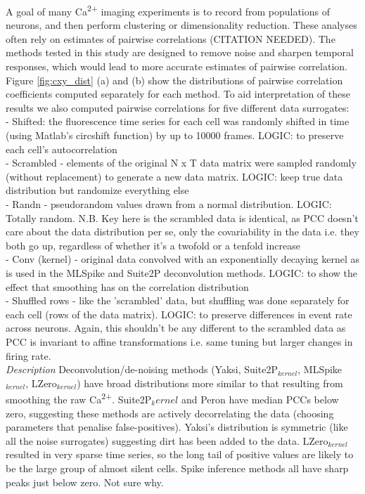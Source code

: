 \documentclass[a4paper,10pt,twocolumn]{article}
\begin{document}
A goal of many Ca\textsuperscript{2+} imaging experiments is to record from populations of neurons, and then perform clustering or dimensionality reduction. These analyses often rely on estimates of pairwise correlations (CITATION NEEDED). The methods tested in this study are designed to remove noise and sharpen temporal responses, which would lead to more accurate estimates of pairwise correlation. Figure \ref{fig:cxy_dist} (a) and (b) show the distributions of pairwise correlation coefficients computed separately for each method. To aid interpretation of these results we also computed pairwise correlations for five different data surrogates: \\
\indent - Shifted: the fluorescence time series for each cell was randomly shifted in time (using Matlab's circshift function) by up to 10000 frames. LOGIC: to preserve each cell's autocorrelation\\
\indent - Scrambled - elements of the original N x T data matrix were sampled randomly (without replacement) to generate a new data matrix. LOGIC: keep true data distribution but randomize everything else\\
\indent - Randn - pseudorandom values drawn from a normal distribution. LOGIC: Totally random. N.B. Key here is the scrambled data is identical, as PCC doesn't care about the data distribution per se, only the covariability in the data i.e. they both go up, regardless of whether it's a twofold or a tenfold increase\\
\indent - Conv (kernel) - original data convolved with an exponentially decaying kernel as is used in the MLSpike and Suite2P deconvolution methods. LOGIC: to show the effect that smoothing has on the correlation distribution \\
\indent - Shuffled rows - like the 'scrambled' data, but shuffling was done separately for each cell (rows of the data matrix). LOGIC: to preserve differences in event rate across neurons. Again, this shouldn't be any different to the scrambled data as PCC is invariant to affine transformations i.e. same tuning but larger changes in firing rate.\\


\emph{Description}
Deconvolution/de-noising methods (Yaksi, Suite2P$_{kernel}$, MLSpike$_{kernel}$, LZero$_{kernel}$) have broad distributions more similar to that resulting from smoothing the raw Ca\textsuperscript{2+}. Suite2P$_kernel$ and Peron have median PCCs below zero, suggesting these methods are actively decorrelating the data (choosing parameters that penalise false-positives). Yaksi's distribution is symmetric (like all the noise surrogates) suggesting dirt has been added to the data. LZero$_{kernel}$ resulted in very sparse time series, so the long tail of positive values are likely to be the large group of almost silent cells. Spike inference methods all have sharp peaks just below zero. Not sure why.\\
\end{document}
